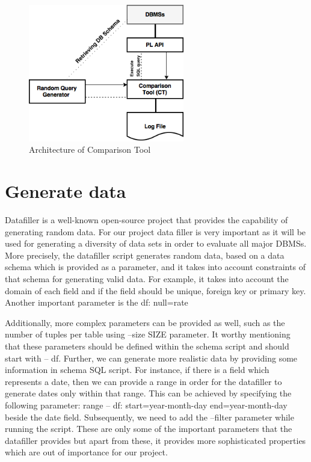  \begin{figure} 
      \centering
      \includegraphics[width=\textwidth,height=6cm]{Images/Chapter4/3-ComparisonTool}
      \caption{Architecture of Comparison Tool}
      \label{fig:counting-methods}
  \end{figure}

\section{Generate data}
Datafiller is a well-known open-source project that provides the capability of generating random data. For our project data filler is very important as it will be used for generating a diversity of  data sets in order to evaluate all major DBMSs. More precisely, the datafiller script generates random data, based on a data schema which is provided as a parameter, and it takes into account constraints of that schema for generating valid data. For example, it takes into account the domain of each field and if the field should be unique, foreign key or primary key. Another important parameter is the df: null=rate%

Additionally, more complex parameters can be provided as well, such as the number of tuples per table using --size SIZE parameter. It worthy mentioning that these parameters should be defined within the schema script and should start with -- df.  Further, we can generate more realistic data by providing some information in schema SQL script. For instance, if there is a field which represents a date, then we can provide a range in order for the datafiller to generate dates only within that range. This can be achieved by specifying the following parameter: range -- df: start=year-month-day end=year-month-day beside the date field. Subsequently, we need to add the --filter parameter while running the script. These are only some of the important parameters that the datafiller provides but apart from these, it provides more sophisticated properties which are out of importance for our project.


